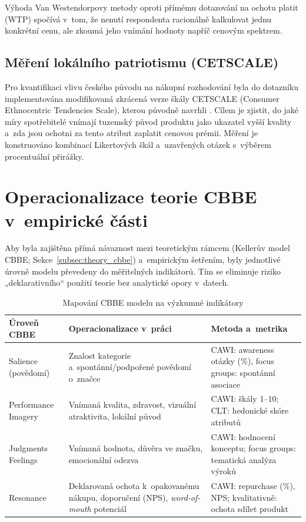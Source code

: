 Výhoda Van Westendorpovy metody oproti přímému dotazování na ochotu platit (WTP) spočívá v~tom, že nenutí respondenta racionálně kalkulovat jednu konkrétní cenu, ale zkoumá jeho vnímání hodnoty napříč cenovým spektrem.

\subsection{Měření lokálního patriotismu (CETSCALE)}
\label{subsec:meth_cetscale}

Pro kvantifikaci vlivu českého původu na nákupní rozhodování byla do dotazníku implementována modifikovaná zkrácená verze škály CETSCALE (Consumer Ethnocentric Tendencies Scale), kterou původně navrhli \textcite{shimp_sharma_1987}. Cílem je zjistit, do jaké míry spotřebitelé vnímají tuzemský původ produktu jako ukazatel vyšší kvality a~zda jsou ochotni za tento atribut zaplatit cenovou prémii. Měření je konstruováno kombinací Likertových škál a~uzavřených otázek s~výběrem procentuální přirážky.

\section{Operacionalizace teorie CBBE v~empirické části}
\label{sec:meth_cbbe_oper}

Aby byla zajištěna přímá návaznost mezi teoretickým rámcem (Kellerův model CBBE; Sekce~\ref{subsec:theory_cbbe}) a~empirickým šetřením, byly jednotlivé úrovně modelu převedeny do měřitelných indikátorů. Tím se eliminuje riziko „deklarativního“ použití teorie bez analytické opory v~datech.

\begin{table}[H]
\centering
\caption{Mapování CBBE modelu na výzkumné indikátory}
\label{tab:cbbe_mapping}
\begin{tabularx}{\textwidth}{l>{\raggedright\arraybackslash}X>{\raggedright\arraybackslash}X}
\toprule
\textbf{Úroveň CBBE} & \textbf{Operacionalizace v~práci} & \textbf{Metoda a~metrika} \\
\midrule
Salience (povědomí) & Znalost kategorie a~spontánní/podpořené povědomí o~značce & CAWI: awareness otázky (\%), focus groups: spontánní asociace \\
Performance \/ Imagery & Vnímaná kvalita, zdravost, vizuální atraktivita, lokální původ & CAWI: škály 1--10; CLT: hedonické skóre atributů \\
Judgments \/ Feelings & Vnímaná hodnota, důvěra ve značku, emocionální odezva & CAWI: hodnocení konceptu; focus groups: tematická analýza výroků \\
Resonance & Deklarovaná ochota k~opakovanému nákupu, doporučení (NPS), \emph{word-of-mouth} potenciál & CAWI: repurchase (\%), NPS; kvalitativně: ochota sdílet produkt \\
\bottomrule
\end{tabularx}
\end{table}

